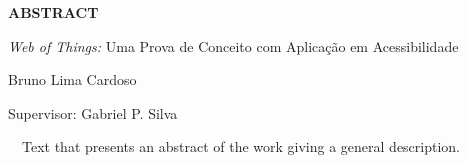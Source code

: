 \begin{titlepage}
\bigskip

\clearpage
\bigskip

\begin{center}
\centerline{\textbf{\large ABSTRACT}}


\bigskip

\emph{Web of Things:} Uma Prova de Conceito com Aplicação em Acessibilidade


\bigskip

Bruno Lima Cardoso


\end{center}
\bigskip


\bigskip

Supervisor: Gabriel P. Silva


\bigskip

\ \ Text that presents an abstract of the work giving a general description.


\bigskip


\bigskip


\bigskip
\end{titlepage}
